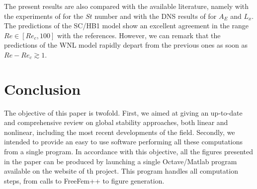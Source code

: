 \documentclass[twocolumn,10pt]{asme2ej}
\begin{document}

The present results are also compared with the available literature, namely with the experiments of \cite{williamson1988defining} for the $St$ number and with the DNS results of \cite{MLugo2014} for $A_E$ and $L_x$.
The predictions of the SC/HB1 model show an excellent agreement in the range $Re \in [Re_c,100]$ with the references. %
However, we can remark that the predictions of the WNL model rapidly depart from the previous ones as soon as $Re-Re_c \gtrsim 1$.





\section{Conclusion}


The objective of this paper is twofold. First, we aimed at giving an up-to-date and comprehensive review on global stability approaches, both linear and nonlinear, including the most recent developments of the field. 
Secondly, we intended to provide an easy to use software performing all these computations from a single program.
In accordance with this objective, all the figures presented in the paper can be produced by launching a single Octave/Matlab program available on the website of th project.
This program handles all computation steps, from calls to FreeFem++ to figure generation.
\end{document}
